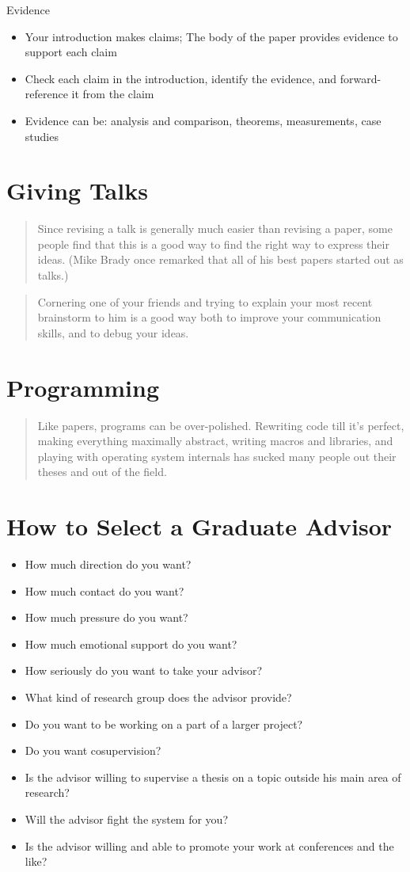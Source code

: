 Evidence
\begin{itemize}
\item Your introduction makes claims; The body of the paper provides evidence to support each claim
\item Check each claim in the introduction, identify the
evidence, and forward-reference it from the claim
\item Evidence can be: analysis and comparison, theorems,
measurements, case studies
\end{itemize}


\section{Giving Talks}
\blockquote{Since revising a talk is generally much easier than revising a
paper, some people find that this is a good way to find the right way to express
their ideas. (Mike Brady once remarked that all of his best papers started out
as talks.)}

\blockquote{Cornering one of your friends and trying to explain your most recent
brainstorm to him is a good way both to improve your communication skills, and
to debug your ideas.}




\section{Programming}
\blockquote{Like papers, programs can be over-polished. Rewriting code till it’s
perfect, making everything maximally abstract, writing macros and libraries, and
playing with operating system internals has sucked many people out their theses
and out of the field.}

\section{How to Select a Graduate Advisor}
\begin{itemize}
\item How much direction do you want? 
\item How much contact do you want? 
\item How much pressure do you want? 
\item How much emotional support do you want? 
\item How seriously do you want to take your advisor? 
\item What kind of research group does the advisor provide? 
\item Do you want to be working on a part of a larger project? 
\item Do you want cosupervision? 
\item Is the advisor willing to supervise a thesis on a topic outside his main area of research? 
\item Will the advisor fight the system for you? 
\item Is the advisor willing and able to promote your work at conferences and the like? 
\end{itemize}


